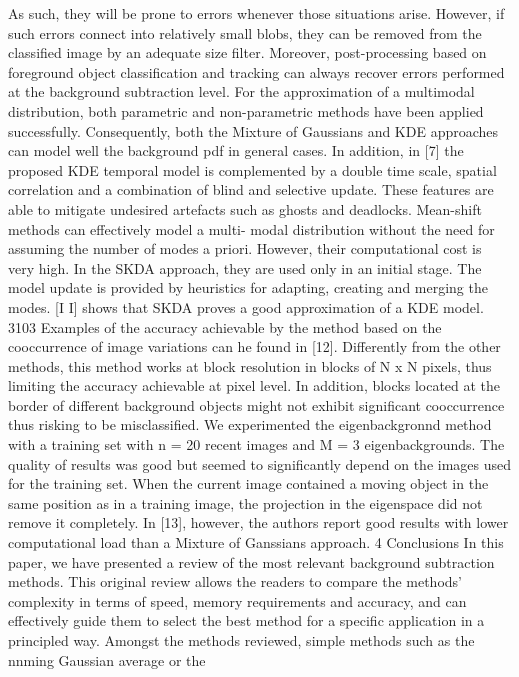As such, they will
be
prone
to
errors
whenever those
situations arise.
However,
if
such
errors
connect
into relatively
small blobs, they can
be
removed
from
the
classified
image by an adequate
size
filter.
Moreover, post-processing based on foreground
object
classification
and
tracking can always recover
errors
performed
at
the background subtraction
level.
For the approximation
of
a multimodal
distribution,
both parametric and non-parametric methods have been
applied successfully. Consequently, both the Mixture of
Gaussians and KDE approaches
can model
well
the
background
pdf
in
general
cases.
In
addition,
in
[7]
the
proposed KDE temporal model
is
complemented by a
double
time
scale, spatial
correlation and a combination
of
blind and
selective
update.
These
features are able
to
mitigate
undesired
artefacts
such
as
ghosts
and
deadlocks.
Mean-shift methods can effectively model a multi-
modal
distribution
without the need
for
assuming the
number
of
modes a
priori.
However,
their
computational
cost
is
very high.
In
the
SKDA approach, they
are
used
only
in
an
initial stage.
The
model update
is
provided by
heuristics for
adapting, creating and merging
the
modes.
[I I]
shows
that
SKDA proves a good approximation
of
a
KDE
model.
3103
Examples
of
the accuracy
achievable by
the
method
based
on
the cooccurrence
of
image
variations
can
he
found
in
[12].
Differently
from
the other
methods, this
method works at
block resolution
in
blocks
of
N
x
N
pixels,
thus limiting the accuracy
achievable
at
pixel level.
In
addition, blocks
located
at
the
border
of
different
background
objects
might not exhibit significant
cooccurrence thus
risking
to
be misclassified.
We experimented the eigenbackgronnd
method with
a
training set
with
n
=
20
recent images
and
M
=
3
eigenbackgrounds.
The
quality of
results
was
good
but
seemed
to
significantly
depend on
the images
used
for the
training
set.
When
the current
image
contained a
moving
object
in the
same
position
as
in a
training
image,
the
projection
in
the eigenspace did
not
remove it
completely.
In
[13],
however,
the
authors report
good
results
with
lower
computational load than a Mixture
of
Ganssians
approach.
4
Conclusions
In
this paper, we have presented
a
review
of
the
most
relevant
background
subtraction methods. This
original review allows
the
readers
to
compare
the
methods’ complexity
in
terms
of
speed, memory
requirements
and
accuracy,
and
can
effectively
guide
them
to
select
the best
method
for a
specific
application in
a principled
way.
Amongst
the
methods
reviewed,
simple
methods
such
as
the
nnming
Gaussian average
or
the
